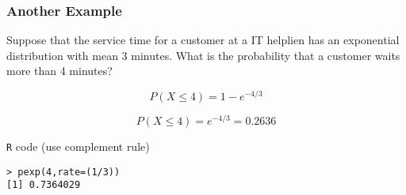 \documentclass[a4]{beamer}
\begin{document}

\begin{frame}[fragile]
\Large
\frametitle{Another Example}
Suppose that the service time for a customer at a IT helplien
has an exponential distribution with mean 3 minutes. What is the probability that a
customer waits more than 4 minutes?

\[ P(X  \leq 4) = 1 -  e^{-4/3} \]

\[ P(X  \leq 4) = e^{-4/3} = 0.2636 \]


\texttt{R} code (use complement rule)
\begin{verbatim}
> pexp(4,rate=(1/3))
[1] 0.7364029
\end{verbatim}
\end{frame}
\end{document}
